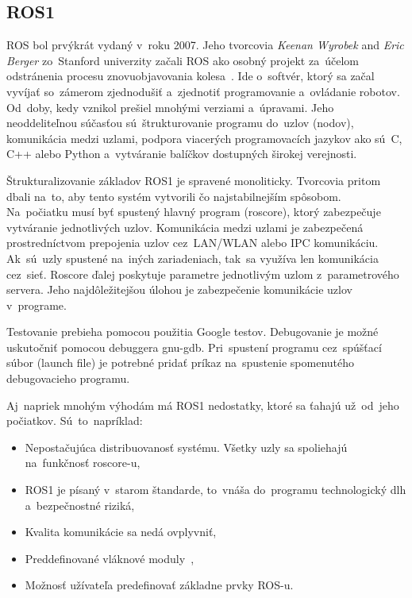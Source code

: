 \subsection{ROS1}
\label{subsec:ros1}

ROS bol prvýkrát vydaný v~roku 2007. Jeho tvorcovia \textit{Keenan Wyrobek} and \textit{Eric Berger} zo~Stanford
univerzity začali ROS ako osobný projekt za~účelom odstránenia procesu znovuobjavovania kolesa~\cite{rosHistory}.
Ide o~softvér, ktorý sa začal vyvíjať so~zámerom zjednodušiť a~zjednotiť programovanie a~ovládanie robotov.
Od~doby, kedy vznikol prešiel mnohými verziami a~úpravami. Jeho neoddeliteľnou súčasťou sú~štrukturovanie programu
do~uzlov (nodov), komunikácia medzi uzlami, podpora viacerých programovacích jazykov ako sú~C, C++ alebo Python
a~vytváranie balíčkov dostupných širokej verejnosti.

Štrukturalizovanie základov ROS1 je spravené monoliticky. Tvorcovia pritom dbali na~to, aby tento
systém vytvorili čo najstabilnejším spôsobom. Na~počiatku musí byť spustený hlavný program (roscore),
ktorý zabezpečuje vytváranie jednotlivých uzlov. Komunikácia medzi uzlami je zabezpečená prostredníctvom
prepojenia uzlov cez~LAN/WLAN alebo IPC komunikáciu. Ak~sú~uzly spustené na~iných zariadeniach,
tak~sa využíva len komunikácia cez~sieť. Roscore ďalej poskytuje parametre jednotlivým uzlom
z~parametrového servera. Jeho najdôležitejšou úlohou je zabezpečenie komunikácie uzlov v~programe.

Testovanie prebieha pomocou použitia Google testov. Debugovanie je možné uskutočniť pomocou debuggera gnu-gdb. Pri~spustení programu
cez~spúšťací súbor (launch file) je potrebné pridať príkaz na~spustenie spomenutého debugovacieho programu.

\clearpage

Aj~napriek mnohým výhodám má ROS1 nedostatky, ktoré sa ťahajú už~od~jeho počiatkov. Sú~to~napríklad:

\begin{itemize}
	\item Nepostačujúca distribuovanosť systému. Všetky uzly sa spoliehajú na~funkčnosť roscore-u,
	\item ROS1 je písaný v~starom štandarde, to~vnáša do~programu technologický dlh a~bezpečnostné riziká,
	\item Kvalita komunikácie sa nedá ovplyvniť,
	\item Preddefinované vláknové moduly~\cite{ROS2design},
	\item Možnosť užívateľa predefinovať základne prvky ROS-u.
\end{itemize}

